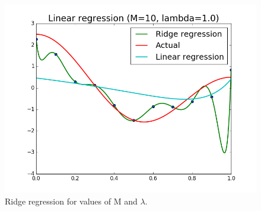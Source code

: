 \documentclass{article}
\begin{document}
\begin{figure}[width=\linewidth]
\begin{multicols}{2}
  \includegraphics[width=1.2\linewidth]{code/P3/ridge_regression,10,1.png}
\end{multicols}
\caption{Ridge regression for values of M and $\lambda$.}
\end{figure}
\end{document}
